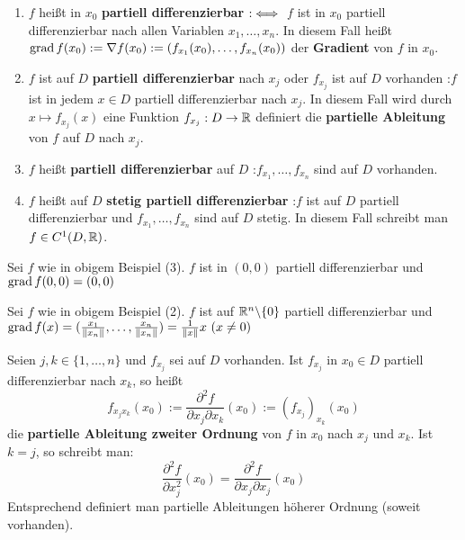 \documentclass[a4paper,oneside,DIV15,BCOR12mm,chapterprefix=true,headings=onelinechapter]{scrbook}
\begin{document}
\def\grad{\mathop{\rm grad}\nolimits}
\begin{definition}
\begin{enumerate}
\item $f$ heißt in $x_0$ \textbf{partiell differenzierbar} $:\iff$ $f$ ist in $x_0$ 
partiell differenzierbar nach allen Variablen $x_1,\ldots, x_n$. In diesem Fall heißt 
$\grad f(x_0) := \nabla f(x_0) := (f_{x_1}(x_0),\ldots, f_{x_n}(x_0))$ der \textbf{Gradient} von 
$f$ in $x_0$. 
\item $f$ ist auf $D$ \textbf{partiell differenzierbar} nach $x_j$ oder $f_{x_j}$ ist auf $D$ vorhanden :\equizu $f$ ist in jedem $x\in D$ partiell differenzierbar nach $x_j$. In diesem Fall wird durch $x\mapsto f_{x_j}(x)$ eine Funktion $f_{x_j}: D\to \mathbb{R}$ definiert die \textbf{partielle Ableitung} von $f$ auf $D$ nach $x_j$.
\item $f$ heißt \textbf{partiell differenzierbar} auf $D$ :\equizu $f_{x_1},\ldots,f_{x_n}$ sind auf $D$ vorhanden.
\item $f$ heißt auf $D$ \textbf{stetig partiell differenzierbar} :\equizu $f$ ist auf $D$ partiell differenzierbar und $f_{x_1},\ldots,f_{x_n}$ sind auf $D$ stetig. In diesem Fall schreibt man $f\in C^1(D,\mathbb{R})$.
\end{enumerate}
\end{definition}

\begin{beispiele}
\item Sei $f$ wie in obigem Beispiel (3). $f$ ist in $(0,0)$ partiell differenzierbar und $\grad f(0,0) = (0,0)$
\item Sei $f$ wie in obigem Beispiel (2). $f$ ist auf $\mathbb{R}^n\backslash\{0\}$ partiell differenzierbar und $\grad f(x) = (\frac{x_1}{\|x_n\|},\ldots,\frac{x_n}{\|x_n\|}) = \frac{1}{\|x\|} x \ (x\ne 0)$
\end{beispiele}

\begin{definition}
Seien $j,k\in\{1,\ldots,n\}$ und $f_{x_j}$ sei auf $D$ vorhanden. Ist $f_{x_j}$ in 
$x_0\in D$ partiell differenzierbar nach $x_k$, so heißt 
$$f_{x_jx_k}(x_0) := \frac{\partial^2 f}{\partial x_j\partial x_k}(x_0) := \left(f_{x_j}\right)_{x_k}(x_0)$$ 
die \textbf{partielle Ableitung zweiter Ordnung} von $f$ in $x_0$ nach $x_j$ und $x_k$. Ist $k=j$, so schreibt man:
$$\frac{\partial^2 f}{\partial x_j^2}(x_0) = \frac{\partial^2 f}{\partial x_j\partial x_j}(x_0) $$ Entsprechend definiert man partielle Ableitungen höherer Ordnung (soweit vorhanden).
\end{definition}
\end{document}
